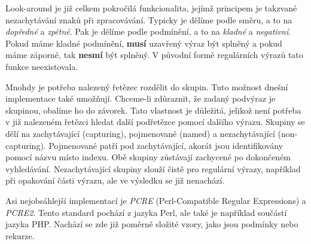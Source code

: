 Look-around je již celkem pokročilá funkcionalita, jejímž principem je takzvané nezachytávání znaků při zpracovávání.
Typicky je dělíme podle směru, a to na \textit{dopředné} a \textit{zpětné}.
Pak je dělíme podle podmínění, a to na \textit{kladné} a \textit{negativní}.
Pokud máme kladné podmínění, \textbf{musí} uzavřený výraz být splněný a pokud máme záporné, tak \textbf{nesmí} být splněný.
V původní formě regulárních výrazů tato funkce neexistovala.

Mnohdy je potřeba nalezený řetězec rozdělit do skupin. 
Tuto možnost dnešní implementace také umožňují.
Chceme-li zdůraznit, že zadaný podvýraz je skupinou, obalíme ho do závorek.
Tato vlastnost je důležitá, jelikož není potřeba v již nalezeném řetězci hledat další podřetězce pomocí dalšího výrazu.
Skupiny se dělí na zachytávající (capturing), pojmenované (named) a nezachytávající (non-capturing).
Pojmenované patří pod zachytávající, akorát jsou identifikovány pomocí názvu místo indexu.
Obě skupiny zůstávají zachycené po dokončeném vyhledávání.
Nezachytávající skupiny slouží čistě pro regulární výrazy, například při opakování části výrazu, ale ve výsledku se již nenachází.

Asi nejobsáhlejší implementací je \textit{PCRE} (Perl-Compatible Regular Expressions) a \textit{PCRE2}.
Tento standard pochází z jazyka Perl, ale také je například součástí jazyka PHP.
Nachází se zde již poměrně složité vzory, jako jsou podmínky nebo rekurze.

\endinput

